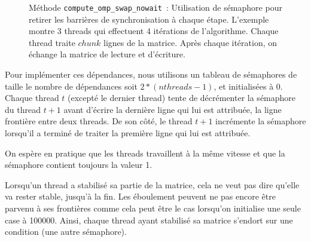 \begin{figure}[!ht]
  \caption{Méthode \texttt{compute\_omp\_swap\_nowait}~: Utilisation
    de sémaphore pour retirer les barrières de synchronisation à
    chaque étape. L'exemple montre 3 threads qui effectuent 4
    itérations de l'algorithme. Chaque thread traite $chunk$ lignes de
    la matrice. Après chaque itération, on échange la matrice de
    lecture et d'écriture.}
  \label{fig:nowait}
\end{figure}

Pour implémenter ces dépendances, nous utilisons un tableau de
sémaphores de taille le nombre de dépendances soit $2*(nthreads-1)$,
et initialisées à 0. Chaque thread $t$ (excepté le dernier thread)
tente de décrémenter la sémaphore du thread $t+1$ avant d'écrire la
dernière ligne qui lui est attribuée, la ligne frontière entre deux
threads. De son côté, le thread $t+1$ incrémente la sémaphore
lorsqu'il a terminé de traiter la première ligne qui lui est
attribuée.
\medskip

On espère en pratique que les threads travaillent à la même vitesse
et que la sémaphore contient toujours la valeur 1.
\medskip

Lorsqu'un thread a stabilisé sa partie de la matrice, cela ne veut pas
dire qu'elle va rester stable, jusqu'à la fin. Les éboulement peuvent
ne pas encore être parvenu à ses frontières comme cela peut être le
cas lorsqu'on initialise une seule case à 100000. Ainsi, chaque thread
ayant stabilisé sa matrice s'endort sur une condition (une autre
sémaphore).
\medskip

